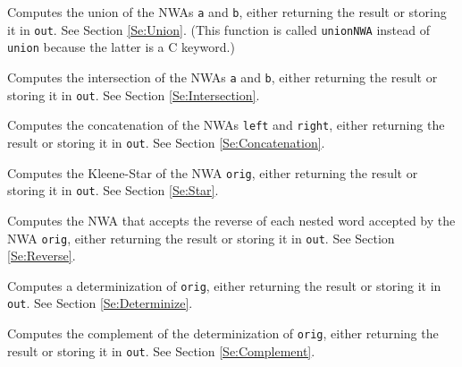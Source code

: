 \begin{functionlist}

    Computes the union of the NWAs \texttt{a} and \texttt{b},
    either returning the result or storing it in \texttt{out}.
    See Section
    \ref{Se:Union}. (This function is called \texttt{unionNWA} instead of
    \texttt{union} because the latter is a C keyword.)

    Computes the intersection of the NWAs \texttt{a} and \texttt{b},
    either returning the result or storing it in \texttt{out}.
    See Section \ref{Se:Intersection}.

    Computes the concatenation of the NWAs \texttt{left} and
    \texttt{right}, either returning the result or storing it in
    \texttt{out}.
    See Section \ref{Se:Concatenation}.

    Computes the Kleene-Star of the NWA \texttt{orig}, either
    returning the result or storing it in \texttt{out}. See Section
    \ref{Se:Star}.

    Computes the NWA that accepts the reverse of each nested word
    accepted by the NWA \texttt{orig}, either returning the result or
    storing it in \texttt{out}. See Section \ref{Se:Reverse}.

    Computes a determinization of \texttt{orig}, either returning the
    result or storing it in \texttt{out}.
    See Section \ref{Se:Determinize}.

    Computes the complement of the determinization of \texttt{orig},
    either returning the result or storing it in \texttt{out}.
    See Section
    \ref{Se:Complement}.
\end{functionlist}

